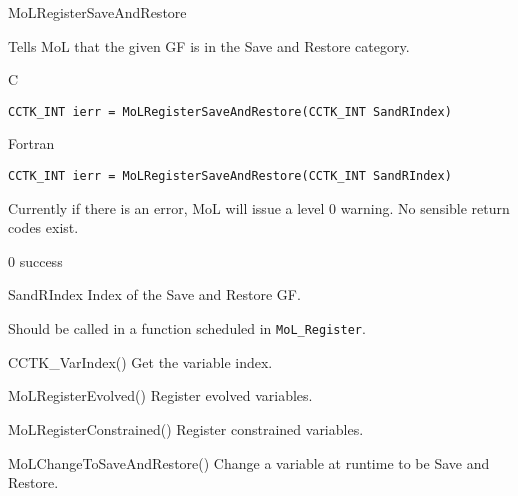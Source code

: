\begin{FunctionDescription}{MoLRegisterSaveAndRestore}
  \label{CactusBase_MoL_MoLRegisterSaveAndRestore}
  
  Tells MoL that the given GF is in the Save and Restore category.

  \begin{SynopsisSection}
    \begin{Synopsis}{C}
\begin{verbatim}
CCTK_INT ierr = MoLRegisterSaveAndRestore(CCTK_INT SandRIndex)
\end{verbatim}
    \end{Synopsis}
    \begin{Synopsis}{Fortran}
\begin{verbatim}
CCTK_INT ierr = MoLRegisterSaveAndRestore(CCTK_INT SandRIndex)
\end{verbatim}
    \end{Synopsis}
  \end{SynopsisSection}

  \begin{ResultSection}
    \begin{ResultNote}
      Currently if there is an error, MoL will issue a level 0
      warning. No sensible return codes exist.
    \end{ResultNote}
    \begin{Result}{\rm 0}
      success
    \end{Result}
  \end{ResultSection}

  \begin{ParameterSection}
    \begin{Parameter}{SandRIndex}
      Index of the Save and Restore GF.
    \end{Parameter}
  \end{ParameterSection}

  \begin{Discussion}
    Should be called in a function scheduled in {\tt MoL\_Register}.
  \end{Discussion}

  \begin{SeeAlsoSection}
    \begin{SeeAlso}{CCTK\_VarIndex()}
      Get the variable index.
    \end{SeeAlso}
    \begin{SeeAlso}{MoLRegisterEvolved()}
      Register evolved variables.
    \end{SeeAlso}
    \begin{SeeAlso}{MoLRegisterConstrained()}
      Register constrained variables.
    \end{SeeAlso}
    \begin{SeeAlso}{MoLChangeToSaveAndRestore()}
      Change a variable at runtime to be Save and Restore.
    \end{SeeAlso}
  \end{SeeAlsoSection}


\end{FunctionDescription}
